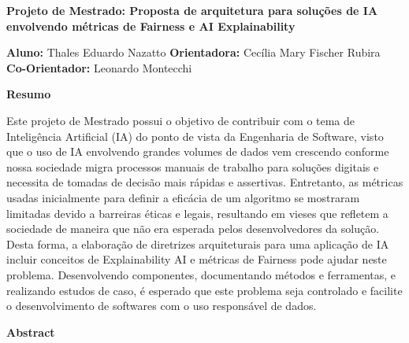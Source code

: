 \documentclass[portugues, 12pt, a4paper]{article}
\begin{document}
\thispagestyle{firststyle}
\hfill \newline \newline \newline \newline
\begin{center}
\textbf{Projeto de Mestrado: Proposta de arquitetura para soluções de IA envolvendo métricas de Fairness e AI Explainability}
\end{center}
\hfill \newline \newline
\textbf{Aluno:} Thales Eduardo Nazatto \newline
\textbf{Orientadora:} Cecília Mary Fischer Rubira \newline
\textbf{Co-Orientador:} Leonardo Montecchi \newline \newline \newline

\begin{center}\textbf{Resumo}\end{center}

Este projeto de Mestrado possui o objetivo de contribuir com o tema de Inteligência Artificial (IA) do ponto de vista da Engenharia de Software, visto que o uso de IA envolvendo grandes volumes de dados vem crescendo conforme nossa sociedade migra processos manuais de trabalho para soluções digitais e necessita de tomadas de decisão mais rápidas e assertivas. Entretanto, as métricas usadas inicialmente para definir a eficácia de um algoritmo se mostraram limitadas devido a barreiras éticas e legais, resultando em vieses que refletem a sociedade de maneira que não era esperada pelos desenvolvedores da solução. Desta forma, a elaboração de diretrizes arquiteturais para uma aplicação de IA incluir conceitos de Explainability AI e métricas de Fairness pode ajudar neste problema. Desenvolvendo componentes, documentando métodos e ferramentas, e realizando estudos de caso, é esperado que este problema seja controlado e facilite o desenvolvimento de softwares com o uso responsável de dados. \newline \newline \newline

\begin{center}\textbf{Abstract}\end{center}
\end{document}
